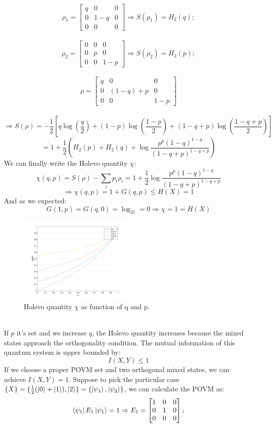 \documentclass[journal, letterpaper]{IEEEtran}
\begin{document}
\[\rho_1 = \begin{bmatrix}
    q & 0 & 0 \\
    0 & 1-q & 0 \\
0 & 0 & 0
\end{bmatrix} \Rightarrow S(\rho_1) = H_2(q);\]
\\
\[\rho_2 = \begin{bmatrix}
    0 & 0 & 0 \\
    0 & p & 0 \\
0 & 0 & 1-p
\end{bmatrix} \Rightarrow S(\rho_2)=H_2(p);\]
\\
\[\rho = \begin{bmatrix}
    q & 0 & 0 \\
    0 & (1-q)+p & 0 \\
0 & 0 & 1-p
\end{bmatrix}\] 
\\
\[ \Rightarrow S(\rho)=-\frac{1}{2}[q\log(\frac{q}{2})+(1-p)\log(\frac{1-p}{2}) +(1-q+p)\log(\frac{1-q+p}{2})]\]
\[= 1+\frac{1}{2}(H_2(p)+H_2(q)+\log\frac{p^p(1-q)^{1-q}}{(1-q+p)^{1-q+p}}) \]
We can finally write the Holevo quantity $\chi$: 
\\
\[\chi(q,p) = S(\rho)-\sum_ip_i\rho_i = 1+\frac{1}{2}\log\frac{p^p(1-q)^{1-q}}{(1-q+p)^{1-q+p}} \]
\[\Rightarrow \chi(q,p) = 1+ G(q,p) \le H(X) = 1\]
And as we expected: \[G(1,p) = G(q,0) = \log_21 = 0 \Rightarrow \chi = 1 = H(X)\]
\begin{figure}[!h]
    \centering
    \includegraphics[width=0.5\textwidth]{graficus.png}
        \caption{Holevo quantity $\chi$ as function of q and p.}
     \label{fig:quadtree}
\end{figure} 
\\
If $p$ it's set and we increase $q$, the Holevo quantity increases because the mixed states approach the orthogonality condition. The mutual information of this quantum system is upper bounded by:
\[I(X,Y) \le 1\]
If we choose a proper POVM set and two orthogonal mixed states, we can achieve $I(X,Y) = 1$. Suppose to pick the particular case $\{X\} = \{\frac{1}{2}(\ket{0}+\ket{1}),\ket{2}\}=\{\ket{\psi_1},\ket{\psi_2}\}$, we can calculate the POVM as: 
\[\bra{\psi_1}E_1\ket{\psi_1} = 1 \Rightarrow E_1 = \begin{bmatrix}
    1 & 0 & 0 \\
    0 & 1 & 0 \\
0 & 0 & 0
\end{bmatrix} ;\]
\end{document}
